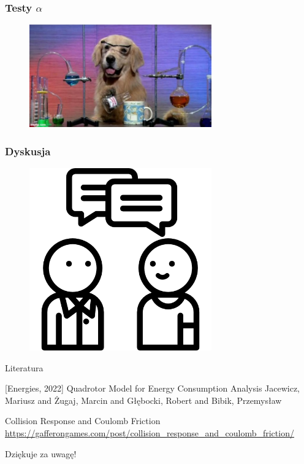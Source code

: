 \documentclass[aspectratio=169]{beamer}
\begin{document}
\begin{frame}
	\frametitle{Testy $\alpha$} %
	\begin{figure}
		\centering
		\includegraphics[width=0.7\textwidth]{dog.jpg}
	\end{figure}
\end{frame}


\begin{frame}
	\frametitle{Dyskusja}
	\begin{figure}
		\centering
		\includegraphics[width=0.7\textwidth]{questions.png}
	\end{figure}
\end{frame}

\begin{frame}{Literatura}
\begin{thebibliography}{10}
\beamertemplatebookbibitems
{}[Energies, 2022] Quadrotor Model for Energy Consumption Analysis
   \newblock  Jacewicz, Mariusz and Żugaj, Marcin and Głębocki, Robert and Bibik, Przemysław
   
  Collision Response and Coulomb Friction
 \newblock \url{https://gafferongames.com/post/collision_response_and_coulomb_friction/}

\end{thebibliography}
\end{frame}

\begin{frame}
	  \begin{center}
	\Huge Dziękuje za uwagę!
	\end{center}
\end{frame}

\end{document}
